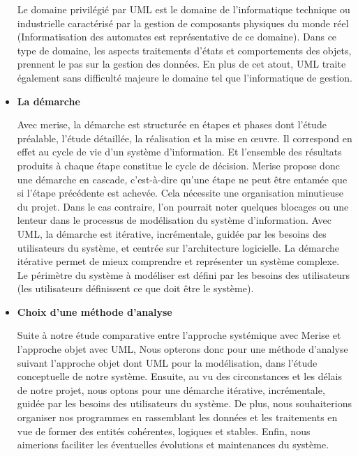 \begin{itemize}
	      Le domaine privilégié par UML est le domaine de l’informatique technique ou industrielle caractérisé par la gestion de composants physiques du monde réel (Informatisation des automates est représentative de ce domaine).
	      Dans ce type de domaine, les aspects traitements d’états et comportements des objets, prennent le pas sur la gestion des données.
	      En plus de cet atout, UML traite également sans difficulté majeure le domaine tel que l’informatique de gestion.

	\item \textbf{La démarche}

	      Avec merise, la démarche est structurée en étapes et phases dont l’étude préalable, l’étude
	      détaillée, la réalisation et la mise en œuvre. Il correspond en effet au cycle de vie d’un système
	      d’information. Et l’ensemble des résultats produits à chaque étape constitue le cycle de décision.
	      Merise propose donc une démarche en cascade, c’est-à-dire qu’une étape ne peut être entamée
	      que si l’étape précédente est achevée. Cela nécessite une organisation minutieuse du projet.
	      Dans le cas contraire, l’on pourrait noter quelques blocages ou une lenteur dans le processus
	      de modélisation du système d’information. Avec UML, la démarche est itérative, incrémentale,
	      guidée par les besoins des utilisateurs du système, et centrée sur l’architecture logicielle. La
	      démarche itérative permet de mieux comprendre et représenter un système complexe. Le
	      périmètre du système à modéliser est défini par les besoins des utilisateurs (les utilisateurs
	      définissent ce que doit être le système).

	\item \textbf{Choix d’une méthode d’analyse}

	      Suite à notre étude comparative entre l’approche systémique avec Merise et l’approche objet avec UML, Nous opterons donc pour une méthode d’analyse suivant l’approche objet dont UML pour la modélisation, dans l’étude conceptuelle de notre système.
	      Ensuite, au vu des circonstances et les délais de notre projet, nous optons pour une démarche itérative, incrémentale, guidée par
	      les besoins des utilisateurs du système. De plus, nous souhaiterions organiser nos programmes
	      en rassemblant les données et les traitements en vue de former des entités cohérentes, logiques
	      et stables. Enfin, nous aimerions faciliter les éventuelles évolutions et maintenances du système.
\end{itemize}

